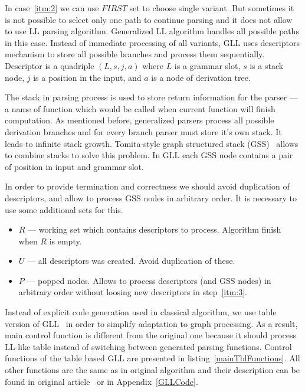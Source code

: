 In case~\ref{itm:2} we can use $FIRST$ set to choose single variant. 
But sometimes it is not possible to select only one path to continue parsing and it does not allow to use LL parsing algorithm.
Generalized LL algorithm handles all possible paths in this case. 
Instead of immediate processing of all variants, GLL uses descriptors mechanism to store all possible branches and process them sequentially. 
Descriptor is a quadriple $(L, s, j, a)$ where $L$ is a grammar slot, $s$ is a stack node, $j$ is a position in the input, and $a$ is a node of derivation tree. 

The stack in parsing process is used to store return information for the parser --- a name of function which would be called when current function will finish computation. 
As mentioned before, generalized parsers process all possible derivation branches and for every branch parser must store it's own stack. It leads to infinite stack growth.  
Tomita-style graph structured stack (GSS)~\cite{Tomita} allows to combine stacks to solve this problem.
In GLL each GSS node contains a pair of position in input and grammar slot. 

In order to provide termination and correctness we should avoid duplication of descriptors, and allow to process GSS nodes in arbitrary order. It is necessary to use some additional sets for this.
\begin{itemize}
\item $R$ --- working set which contains descriptors to process. Algorithm finish when $R$ is empty.
\item $U$ --- all descriptors was created. Avoid duplication of these.
\item $P$ --- popped nodes. Allows to process descriptors (and GSS nodes) in arbitrary order without loosing new descriptors in step~\ref{itm:3}. 
\end{itemize}

Instead of explicit code generation used in classical algorithm, we use table version of GLL~\cite{TableGLL} in order to simplify adaptation to graph processing.
As a result, main control function is different from the original one because it should process LL-like table instead of switching between generated parsing functions.
Control functions of the table based GLL are presented in listing~\ref{mainTblFunctions}. All other functions are the same as in original algorithm and their description can be found in original article~\cite{scott2010gll} or in Appendix~\ref{GLLCode}.


